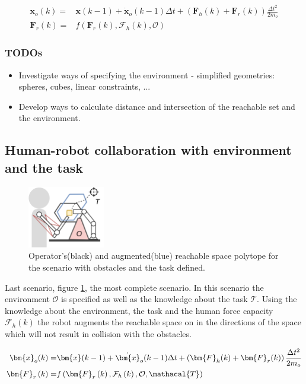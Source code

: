 \begin{equation}
\begin{split}
    \bm{x}_o(k) =& \bm{x}(k-1) + \dot{\bm{x}}_o(k-1)\Delta t +  \left(\bm{F}_h(k)+\bm{F}_r(k)\right)\frac{\Delta t^2}{2m_o}\\ 
    \bm{F}_r\left(k\right) =& f\left(\bm{F}_r\left(k\right), \mathcal{F}_h\left(k\right), \mathcal{O}\right)
\end{split}
\end{equation}


\subsubsection*{TODOs}
\begin{itemize}
    \item Investigate ways of specifying the environment - simplified geometries: spheres, cubes, linear constraints, ...
    \item Develop ways to calculate distance and intersection of the reachable set and the environment. 
\end{itemize}

\subsection{Human-robot collaboration with environment and the task}
\begin{figure}[htb!]
    \centering
    \includegraphics[width=0.3\textwidth]{Papers/lichie/g4.png}
    \caption{Operator's(black) and augmented(blue) reachable space polytope for the scenario with obstacles and the task defined.}
    \label{fig:goal4}
\end{figure}
Last scenario, figure \ref{fig:goal4}, the most complete scenario. In this scenario the environment $\mathcal{O}$ is specified as well as the knowledge about the task $\mathcal{T}$. Using the knowledge about the environment, the task and the human force capacity $\mathcal{F}_h(k)$ the robot augments the reachable space on in the directions of the space which will not result in collision with the obstacles.

\begin{equation}
\begin{split}
    \bm{x}_o(k) =& \bm{x}(k-1) + \dot{\bm{x}}_o(k-1)\Delta t +  \left(\bm{F}_h(k)+\bm{F}_r(k)\right)\frac{\Delta t^2}{2m_o}\\ 
    \bm{F}_r\left(k\right) =& f\left(\bm{F}_r\left(k\right), \mathcal{F}_h\left(k\right), \mathcal{O}, \mathacal{T}\right)
\end{split}
\end{equation}
